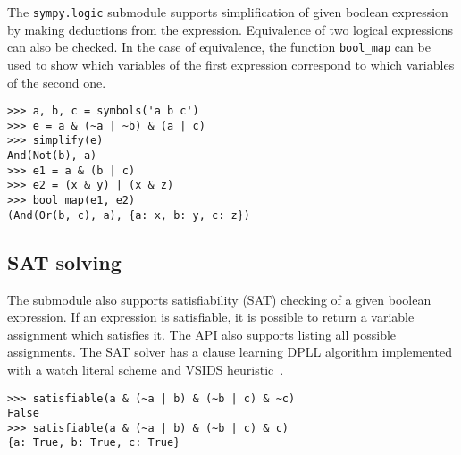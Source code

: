 The \texttt{sympy.logic} submodule supports simplification of given boolean expression by making
deductions from the expression. Equivalence of two logical expressions can also
be checked. In the case of equivalence, the function \texttt{bool\_map}
can be used to show which variables of the first expression correspond
to which variables of the second one.

\begin{verbatim}
>>> a, b, c = symbols('a b c')
>>> e = a & (~a | ~b) & (a | c)
>>> simplify(e)
And(Not(b), a)
>>> e1 = a & (b | c)
>>> e2 = (x & y) | (x & z)
>>> bool_map(e1, e2)
(And(Or(b, c), a), {a: x, b: y, c: z})
\end{verbatim}

\subsection{SAT solving}

The submodule also supports satisfiability (SAT) checking of a given boolean
expression. If an expression is satisfiable, it is possible to return
a variable assignment which satisfies it. The API also supports
listing all possible assignments.
The SAT solver has a clause learning DPLL algorithm implemented with a watch
literal scheme and VSIDS heuristic~\cite{moskewicz2008method}.

\begin{verbatim}
>>> satisfiable(a & (~a | b) & (~b | c) & ~c)
False
>>> satisfiable(a & (~a | b) & (~b | c) & c)
{a: True, b: True, c: True}
\end{verbatim}

